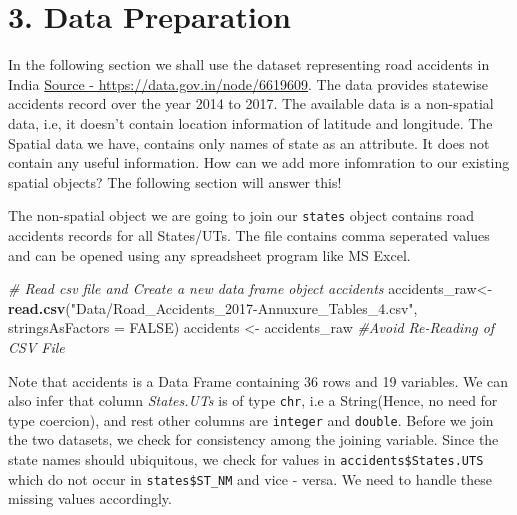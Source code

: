 \documentclass[]{article}
\newenvironment{Shaded}{}{}
\newcommand{\CommentTok}[1]{\textcolor[rgb]{0.38,0.63,0.69}{\textit{#1}}}
\newcommand{\DataTypeTok}[1]{\textcolor[rgb]{0.56,0.13,0.00}{#1}}
\newcommand{\KeywordTok}[1]{\textcolor[rgb]{0.00,0.44,0.13}{\textbf{#1}}}
\newcommand{\NormalTok}[1]{#1}
\newcommand{\OperatorTok}[1]{\textcolor[rgb]{0.40,0.40,0.40}{#1}}
\newcommand{\OtherTok}[1]{\textcolor[rgb]{0.00,0.44,0.13}{#1}}
\newcommand{\StringTok}[1]{\textcolor[rgb]{0.25,0.44,0.63}{#1}}
\begin{document}
\hypertarget{data-preparation}{%
\section{3. Data Preparation}\label{data-preparation}}

In the following section we shall use the dataset representing road
accidents in India \href{https://data.gov.in/node/6619609}{Source -
https://data.gov.in/node/6619609}. The data provides statewise accidents
record over the year 2014 to 2017. The available data is a non-spatial
data, i.e, it doesn't contain location information of latitude and
longitude. The Spatial data we have, contains only names of state as an
attribute. It does not contain any useful information. How can we add
more infomration to our existing spatial objects? The following section
will answer this!

The non-spatial object we are going to join our \texttt{states} object
contains road accidents records for all States/UTs. The file contains
comma seperated values and can be opened using any spreadsheet program
like MS Excel.

\begin{Shaded}
\begin{Highlighting}[]
\CommentTok{# Read csv file and Create a new data frame object accidents}
\NormalTok{accidents_raw<-}\StringTok{ }\KeywordTok{read.csv}\NormalTok{(}\StringTok{"Data/Road_Accidents_2017-Annuxure_Tables_4.csv"}\NormalTok{, }\DataTypeTok{stringsAsFactors =} \OtherTok{FALSE}\NormalTok{)}
\NormalTok{accidents <-}\StringTok{ }\NormalTok{accidents_raw }\CommentTok{#Avoid Re-Reading of CSV File}
\end{Highlighting}
\end{Shaded}

Note that accidents is a Data Frame containing 36 rows and 19 variables.
We can also infer that column \emph{States.UTs} is of type \texttt{chr},
i.e a String(Hence, no need for type coercion), and rest other columns
are \texttt{integer} and \texttt{double}. Before we join the two
datasets, we check for consistency among the joining variable. Since the
state names should ubiquitous, we check for values in
\texttt{accidents\$States.UTS} which do not occur in
\texttt{states\$ST\_NM} and vice - versa. We need to handle these
missing values accordingly.

\begin{Shaded}
\end{Shaded}
\end{document}
